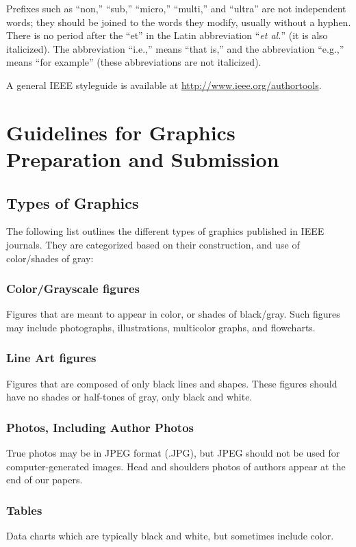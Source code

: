 \documentclass{ieeeaccess}
\begin{document}
Prefixes such as ``non,'' ``sub,'' ``micro,'' ``multi,'' and ``ultra'' are
not independent words; they should be joined to the words they modify,
usually without a hyphen. There is no period after the ``et'' in the Latin
abbreviation ``\emph{et al.}'' (it is also italicized). The abbreviation ``i.e.,'' means
``that is,'' and the abbreviation ``e.g.,'' means ``for example'' (these
abbreviations are not italicized).

A general IEEE styleguide is available at \underline{http://www.ieee.}\break\underline{org/authortools}.

\section{Guidelines for Graphics Preparation and Submission}
\label{sec:guidelines}

\subsection{Types of Graphics}
The following list outlines the different types of graphics published in
IEEE journals. They are categorized based on their construction, and use of
color/shades of gray:

\subsubsection{Color/Grayscale figures}
{Figures that are meant to appear in color, or shades of black/gray. Such
    figures may include photographs, illustrations, multicolor graphs, and
    flowcharts.}

\subsubsection{Line Art figures}
{Figures that are composed of only black lines and shapes. These figures
    should have no shades or half-tones of gray, only black and white.}

\subsubsection{Photos, Including Author Photos}
{True photos may be in JPEG format (.JPG), but JPEG should not be used for computer-generated images. Head and shoulders photos of authors appear at the end of our papers.}

\subsubsection{Tables}
{Data charts which are typically black and white, but sometimes include
    color.}
\end{document}
